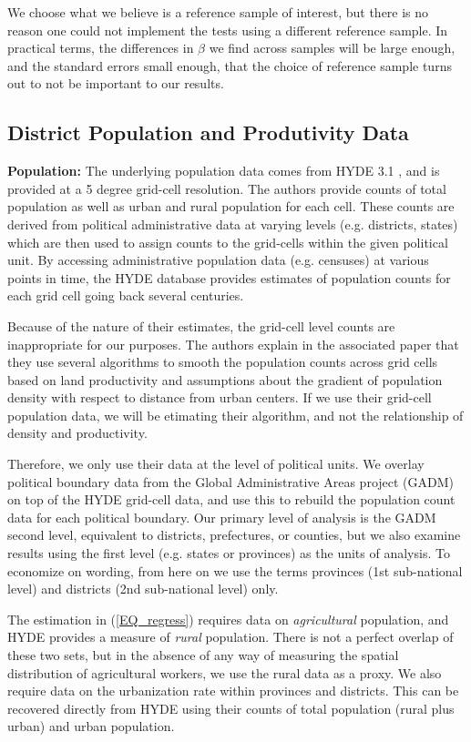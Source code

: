 \documentclass[11pt]{article}
\begin{document}
We choose what we believe is a reference sample of interest, but there is no reason one could not implement the tests using a different reference sample. In practical terms, the differences in $\beta$ we find across samples will be large enough, and the standard errors small enough, that the choice of reference sample turns out to not be important to our results. 

\subsection{District Population and Produtivity Data}

\noindent\textbf{Population:} The underlying population data comes from HYDE 3.1 \citep{hyde31}, and is provided at a 5 degree grid-cell resolution. The authors provide counts of total population as well as urban and rural population for each cell. These counts are derived from political administrative data at varying levels (e.g. districts, states) which are then used to assign counts to the grid-cells within the given political unit. By accessing administrative population data (e.g. censuses) at various points in time, the HYDE database provides estimates of population counts for each grid cell going back several centuries.

Because of the nature of their estimates, the grid-cell level counts are inappropriate for our purposes. The authors explain in the associated paper that they use several algorithms to smooth the population counts across grid cells based on land productivity and assumptions about the gradient of population density with respect to distance from urban centers. If we use their grid-cell population data, we will be etimating their algorithm, and not the relationship of density and productivity.

Therefore, we only use their data at the level of political units. We overlay political boundary data from the Global Administrative Areas project (GADM) on top of the HYDE grid-cell data, and use this to rebuild the population count data for each political boundary. Our primary level of analysis is the GADM second level, equivalent to districts, prefectures, or counties, but we also examine results using the first level (e.g. states or provinces) as the units of analysis. To economize on wording, from here on we use the terms provinces (1st sub-national level) and districts (2nd sub-national level) only.

The estimation in (\ref{EQ_regress}) requires data on \textit{agricultural} population, and HYDE provides a measure of \textit{rural} population. There is not a perfect overlap of these two sets, but in the absence of any way of measuring the spatial distribution of agricultural workers, we use the rural data as a proxy. We also require data on the urbanization rate within provinces and districts. This can be recovered directly from HYDE using their counts of total population (rural plus urban) and urban population.
\end{document}
